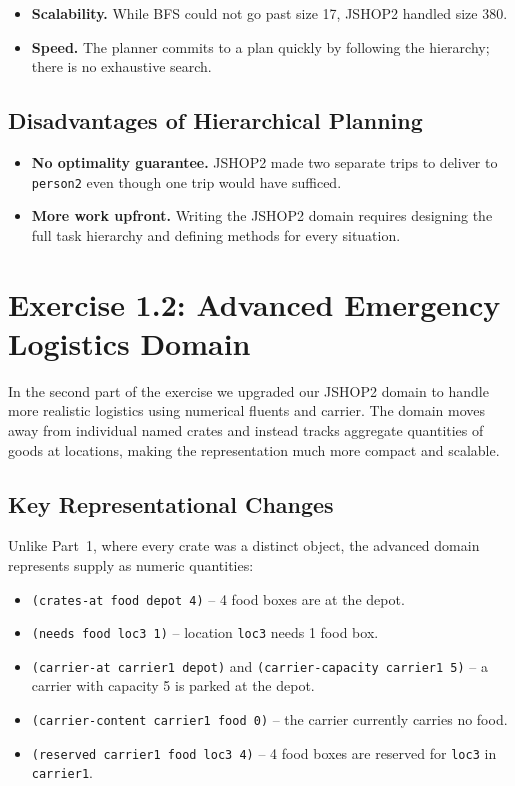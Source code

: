 \documentclass{article}
\begin{document}
\begin{itemize}
    \item \textbf{Scalability.} While BFS could not go past size 17, JSHOP2 handled size 380.
    \item \textbf{Speed.} The planner commits to a plan quickly by following the hierarchy; there is no exhaustive search.
\end{itemize}

\subsection{Disadvantages of Hierarchical Planning}

\begin{itemize}
    \item \textbf{No optimality guarantee.} JSHOP2 made two separate trips to deliver to \texttt{person2} even though one trip would have sufficed.
    \item \textbf{More work upfront.} Writing the JSHOP2 domain requires designing the full task hierarchy and defining methods for every situation.
\end{itemize}

\section{Exercise 1.2: Advanced Emergency Logistics Domain}

In the second part of the exercise we upgraded our JSHOP2 domain to handle more realistic logistics using numerical fluents and carrier. The domain moves away from individual named crates and instead tracks aggregate quantities of goods at locations, making the representation much more compact and scalable.

\subsection{Key Representational Changes}

Unlike Part~1, where every crate was a distinct object, the advanced domain represents supply as numeric quantities:

\begin{itemize}
    \item \texttt{(crates-at food depot 4)} -- 4 food boxes are at the depot.
    \item \texttt{(needs food loc3 1)} -- location \texttt{loc3} needs 1 food box.
    \item \texttt{(carrier-at carrier1 depot)} and \texttt{(carrier-capacity carrier1 5)} -- a carrier with capacity 5 is parked at the depot.
    \item \texttt{(carrier-content carrier1 food 0)} -- the carrier currently carries no food.
    \item \texttt{(reserved carrier1 food loc3 4)} -- 4 food boxes are reserved for \texttt{loc3} in \texttt{carrier1}.
\end{itemize}
\end{document}
